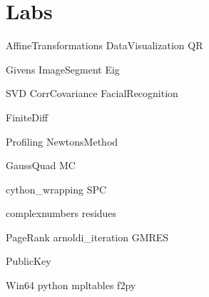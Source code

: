 \documentclass[nociteref]{SIAM-GH-book}
\begin{document}
\part{Labs}
{AffineTransformations}
{DataVisualization}
{QR}


{Givens}
{ImageSegment}
{Eig}


{SVD}
{CorrCovariance}
{FacialRecognition}

{FiniteDiff}

{Profiling}
{NewtonsMethod}


{GaussQuad}
{MC}

{cython_wrapping}
{SPC}

{complexnumbers}
{residues}

{PageRank}
{arnoldi_iteration}
{GMRES}

{PublicKey}


\begin{appendices}
{Win64}
{python}
{mpltables}
{f2py}
\end{appendices}
\end{document}
